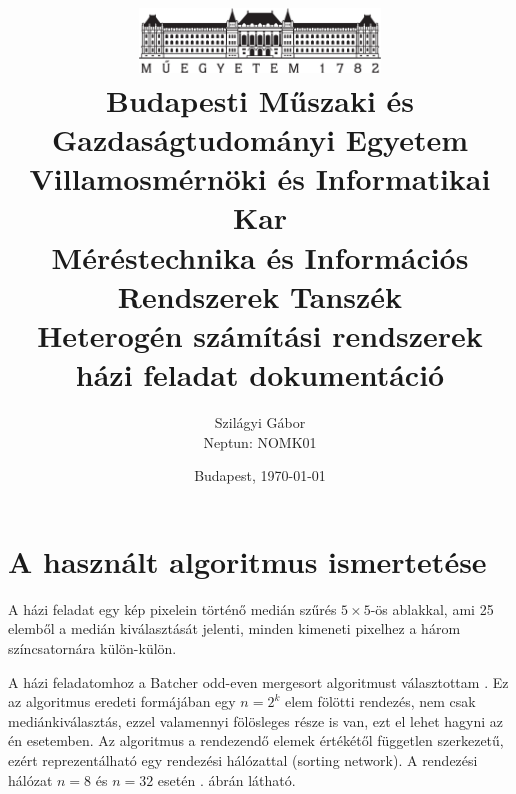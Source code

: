 \title{
	\centering
	\includegraphics[width=0.48\textwidth]{kep/bme_logo.pdf} \\
	\vspace{0.5cm}
	\large{\bf Budapesti Műszaki és Gazdaságtudományi Egyetem \\
	Villamosmérnöki és Informatikai Kar \\
	Méréstechnika és Információs Rendszerek Tanszék}\\
	\vspace{5cm}
	\Large{\bf{Heterogén számítási rendszerek\\házi feladat dokumentáció}} \\
	\vspace{3cm}
}


\author{Szilágyi Gábor \\ Neptun: NOMK01\\\vspace{1cm}}
\date{Budapest, \today}


	\maketitle
	\setcounter{page}{2}
	\tableofcontents
	\clearpage
	\section{A használt algoritmus ismertetése}
		A házi feladat egy kép pixelein történő medián szűrés $5\times5$-ös ablakkal, ami 25 elemből a medián kiválasztását jelenti, minden kimeneti pixelhez a három színcsatornára külön-külön.

		A házi feladatomhoz a Batcher odd-even mergesort algoritmust választottam \cite{batcher}. Ez az algoritmus eredeti formájában egy $n=2^k$ elem fölötti rendezés, nem csak mediánkiválasztás, ezzel valamennyi fölösleges része is van, ezt el lehet hagyni az én esetemben. Az algoritmus a rendezendő elemek értékétől független szerkezetű, ezért reprezentálható egy rendezési hálózattal (sorting network). A rendezési hálózat $n=8$ és $n=32$ esetén . ábrán látható.

